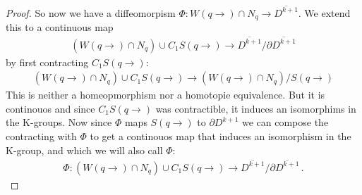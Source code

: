 \begin{proof}
So now we have a diffeomorpism $\Phi:W(q\to)\cap N_q\to \overline{D^{k+1}}$. We extend this to a continuous map 
\begin{align*}
	(W(q\to)\cap N_q)\cup C_1S(q\to) \to \overline{D^{k+1}}\slash \partial \overline{D^{k+1}}
\end{align*} by first contracting $C_1S(q\to)$:
\begin{align*}
	(W(q\to)\cap N_q)\cup C_1S(q\to) \to 	(W(q\to)\cap N_q) \big/ S(q\to)
\end{align*} This is neither a homeopmorphism nor a homotopie equivalence. But it is continouos and since $C_1S(q\to)$ was contractible, it induces an isomorphims in the K-groups. Now since $\Phi$ maps $S(q\to)$ to $\partial D^{k+1}$ we can compose the contracting with $\Phi$ to get a continouos map that induces an isomorphism in the K-group, and which we will also call $\Phi$:
\begin{align*}
	\Phi: (W(q\to)\cap N_q)\cup C_1S(q\to) \to \overline{D^{k+1}}\slash \partial \overline{D^{k+1}} \,. 
\end{align*}


\end{proof}
